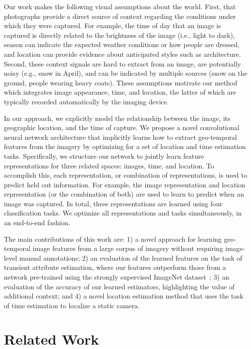 Our work makes the following visual assumptions about the world.
First, that photographs provide a direct source of context regarding
the conditions under which they were captured. For example, the time
of day that an image is captured is directly related to the brightness
of the image (i.e., light to dark), season can indicate the expected
weather conditions or how people are dressed, and location can provide
evidence about anticipated styles such as architecture. Second, these
context signals are hard to extract from an image, are potentially
noisy (e.g., snow in April), and can be indicated by multiple sources
(snow on the ground, people wearing heavy coats). These assumptions
motivate our method which integrates image appearance, time, and
location, the latter of which are typically recorded automatically by
the imaging device.

In our approach, we explicitly model the relationship between the
image, its geographic location, and the time of capture. We propose a
novel convolutional neural network architecture that implicitly learns
how to extract geo-temporal features from the imagery by optimizing for
a set of location and time estimation tasks. Specifically,
we structure our network to jointly learn feature representations for
three related spaces: images, time, and location. To accomplish this,
each representation, or combination of representations, is used to
predict held out information. For example, the image representation
and location representation (or the combination of both) are used to
learn to predict when an image was captured. In total, three representations 
are learned using four classification tasks.  We optimize all representations and tasks simultaneously, in an end-to-end fashion.

The main contributions of this work are: 1) a novel approach for
learning geo-temporal image features from a large corpus of imagery
without requiring image-level manual annotations; 2) an evaluation of
the learned features on the task of transient attribute estimation,
where our features outperform those from a network pre-trained using
the strongly supervised ImageNet dataset~\cite{ILSVRC15}; 3) an
evaluation of the accuracy of our learned estimators, highlighting the
value of additional context; and 4) a novel location estimation method
that uses the task of time estimation to localize a static camera. 

\section{Related Work}

